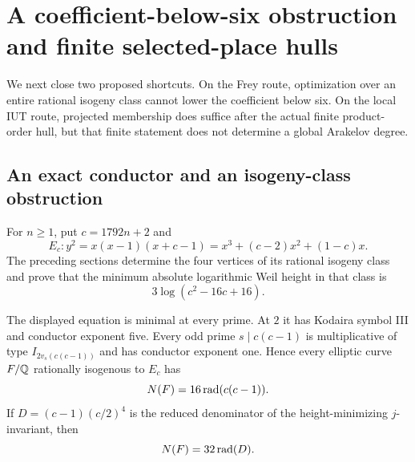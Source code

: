 \section{A coefficient-below-six obstruction and finite selected-place hulls}
\label{sec:conductor-product-hull}

We next close two proposed shortcuts.  On the Frey route, optimization over
an entire rational isogeny class cannot lower the coefficient below six.  On
the local IUT route, projected membership does suffice after the actual
finite product-order hull, but that finite statement does not determine a
global Arakelov degree.

\subsection{An exact conductor and an isogeny-class obstruction}

For $n\geq1$, put $c=1792n+2$ and
\[
 E_c:y^2=x(x-1)(x+c-1)
     =x^3+(c-2)x^2+(1-c)x.
\]
The preceding sections determine the four vertices of its rational isogeny
class and prove that the minimum absolute logarithmic Weil height in that
class is
\begin{equation}\label{eq:new-entire-min-height}
                     3\log(c^2-16c+16).
\end{equation}

\begin{proposition}
\label{prop:new-frey-conductor}
The displayed equation is minimal at every prime.  At $2$ it has Kodaira
symbol III and conductor exponent five.  Every odd prime
$s\mid c(c-1)$ is multiplicative of type
$I_{2v_s(c(c-1))}$ and has conductor exponent one.  Hence every elliptic
curve $F/\mathbb Q$ rationally isogenous to $E_c$ has
\begin{equation}\label{eq:new-frey-conductor}
              N(F)=16\operatorname{rad}(c(c-1)).
\end{equation}
If $D=(c-1)(c/2)^4$ is the reduced denominator of the height-minimizing
$j$-invariant, then
\begin{equation}\label{eq:new-frey-den-conductor}
                         N(F)=32\operatorname{rad}(D).
\end{equation}
\end{proposition}

